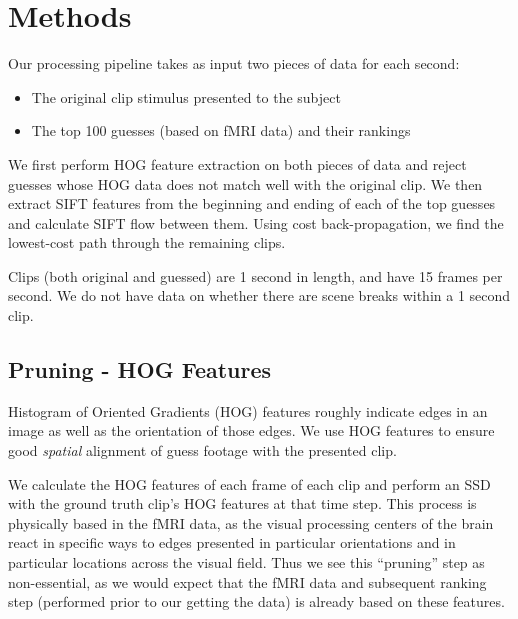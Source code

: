
\section{Methods}

Our processing pipeline takes as input two pieces of data for each second:

\begin{itemize}
\item The original clip stimulus presented to the subject
\item The top 100 guesses (based on fMRI data) and their rankings
\end{itemize}

We first perform HOG feature extraction on both pieces of data and reject guesses whose HOG data does not match well with the original clip.  We then extract SIFT features from the beginning and ending of each of the top guesses and calculate SIFT flow between them.  Using cost back-propagation, we find the lowest-cost path through the remaining clips.  

Clips (both original and guessed) are 1 second in length, and have 15 frames per second.  We do not have data on whether there are scene breaks within a 1 second clip.  

\subsection{Pruning - HOG Features}

Histogram of Oriented Gradients (HOG) features roughly indicate edges in an image as well as the orientation of those edges.  We use HOG features to ensure good \emph{spatial} alignment of guess footage with the presented clip.

We calculate the HOG features of each frame of each clip and perform an SSD with the ground truth clip's HOG features at that time step.  This process is physically based in the fMRI data, as the visual processing centers of the brain react in specific ways to edges presented in particular orientations and in particular locations across the visual field.  Thus we see this ``pruning'' step as non-essential, as we would expect that the fMRI data and subsequent ranking step (performed prior to our getting the data) is already based on these features.   

